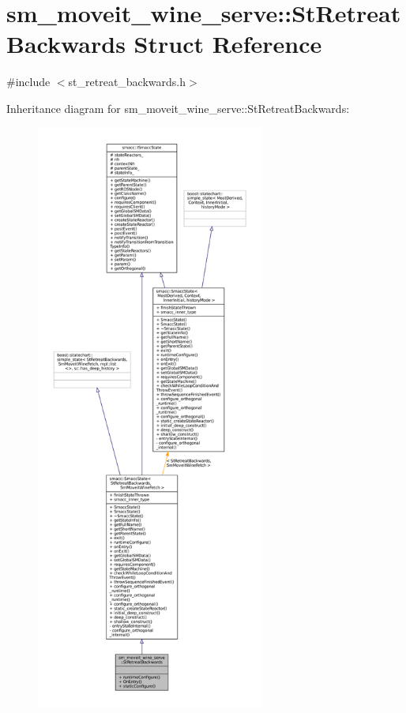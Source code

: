 \hypertarget{structsm__moveit__wine__serve_1_1StRetreatBackwards}{}\section{sm\+\_\+moveit\+\_\+wine\+\_\+serve\+:\+:St\+Retreat\+Backwards Struct Reference}
\label{structsm__moveit__wine__serve_1_1StRetreatBackwards}


{\ttfamily \#include $<$st\+\_\+retreat\+\_\+backwards.\+h$>$}



Inheritance diagram for sm\+\_\+moveit\+\_\+wine\+\_\+serve\+:\+:St\+Retreat\+Backwards\+:
\nopagebreak
\begin{figure}[H]
\begin{center}
\leavevmode
\includegraphics[height=550pt]{structsm__moveit__wine__serve_1_1StRetreatBackwards__inherit__graph}
\end{center}
\end{figure}


